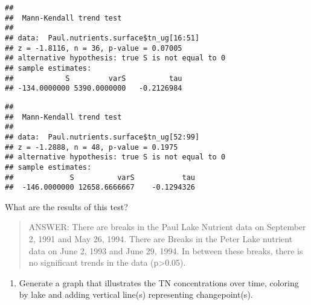 \documentclass[]{article}
\newenvironment{Shaded}{\begin{snugshade}}{\end{snugshade}}
\newcommand{\KeywordTok}[1]{\textcolor[rgb]{0.13,0.29,0.53}{\textbf{#1}}}
\newcommand{\DecValTok}[1]{\textcolor[rgb]{0.00,0.00,0.81}{#1}}
\newcommand{\OperatorTok}[1]{\textcolor[rgb]{0.81,0.36,0.00}{\textbf{#1}}}
\newcommand{\NormalTok}[1]{#1}
\providecommand{\tightlist}{%
  \setlength{\itemsep}{0pt}\setlength{\parskip}{0pt}}
\begin{document}
\begin{Shaded}
\end{Shaded}

\begin{verbatim}
## 
##  Mann-Kendall trend test
## 
## data:  Paul.nutrients.surface$tn_ug[16:51]
## z = -1.8116, n = 36, p-value = 0.07005
## alternative hypothesis: true S is not equal to 0
## sample estimates:
##            S         varS          tau 
## -134.0000000 5390.0000000   -0.2126984
\end{verbatim}

\begin{Shaded}
\end{Shaded}

\begin{verbatim}
## 
##  Mann-Kendall trend test
## 
## data:  Paul.nutrients.surface$tn_ug[52:99]
## z = -1.2888, n = 48, p-value = 0.1975
## alternative hypothesis: true S is not equal to 0
## sample estimates:
##             S          varS           tau 
##  -146.0000000 12658.6666667    -0.1294326
\end{verbatim}

What are the results of this test?

\begin{quote}
ANSWER: There are breaks in the Paul Lake Nutrient data on September 2,
1991 and May 26, 1994. There are Breaks in the Peter Lake nutrient data
on June 2, 1993 and June 29, 1994. In between these breaks, there is no
significant trends in the data (p\textgreater{}0.05).
\end{quote}

\begin{enumerate}
\def\labelenumi{\arabic{enumi}.}
\setcounter{enumi}{4}
\tightlist
\item
  Generate a graph that illustrates the TN concentrations over time,
  coloring by lake and adding vertical line(s) representing
  changepoint(s).
\end{enumerate}
\end{document}
